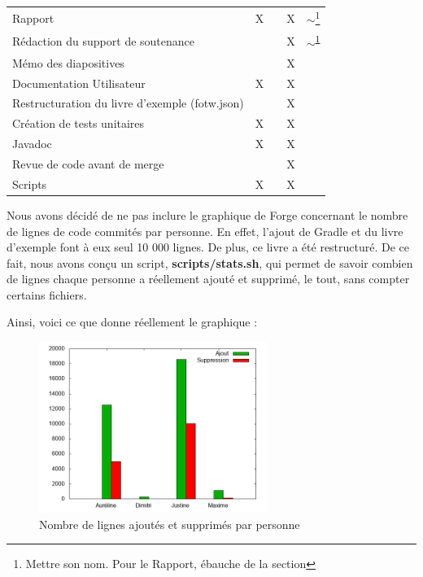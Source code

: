 \begin{centering}
\begin{longtable}{|p{8cm}|c|c|c|c|}
				\rowcolor{lightgray} \multicolumn{5}{|c|}{ \textbf{Autre}}\\
				\hline
				Rapport & X & & X & $\sim$\footnote{\label{footnote:nom}Mettre son nom. Pour le Rapport, ébauche de la section \nameref{sec:arborescenceProjet}}\\
				\hline
				Rédaction du support de soutenance & & & X & $\sim$\textsuperscript{\ref{footnote:nom}}\\
				\hline
				Mémo des diapositives & & & X &\\
				\hline
				Documentation Utilisateur & X & & X &\\
				\hline
				Restructuration du livre d'exemple (fotw.json) & & & X & \\
				\hline
				Création de tests unitaires & X & & X & \\
				\hline
				Javadoc & X & & X & \\
				\hline
				Revue de code avant de merge & & & X & \\
				\hline
				Scripts & X & & X & \\
				\hline
			\end{longtable}
		\end{centering}

		Nous avons décidé de ne pas inclure le graphique de Forge concernant le nombre de lignes de code commités par personne. En effet, l'ajout de Gradle et du livre d'exemple font à eux seul 10 000 lignes. De plus, ce livre a été restructuré. De ce fait, nous avons conçu un script, \textbf{scripts/stats.sh}, qui permet de savoir combien de lignes chaque personne a réellement ajouté et supprimé, le tout, sans compter certains fichiers.

		Ainsi, voici ce que donne réellement le graphique :

		\begin{figure}[H]
			\centering\includegraphics[width=0.66\textwidth, keepaspectratio]{img/repo_stats.png}
			\caption{Nombre de lignes ajoutés et supprimés par personne}
		\end{figure}

